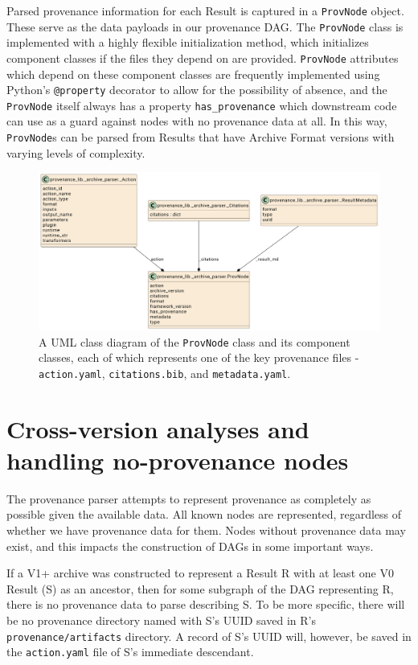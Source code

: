 Parsed provenance information for each Result is captured in a \texttt{ProvNode} object.
These serve as the data payloads in our provenance DAG. The \texttt{ProvNode} class is
implemented with a highly flexible initialization method, which initializes
component classes if the files they depend on are provided. \texttt{ProvNode} attributes
which depend on these component classes are frequently implemented using
Python’s \texttt{@property} decorator to allow for the possibility of absence, and the
\texttt{ProvNode} itself always has a property \texttt{has\_provenance} which downstream code can
use as a guard against nodes with no provenance data at all. In this way,
\texttt{ProvNode}s can be parsed from Results that have Archive Format versions with
varying levels of complexity. 

\begin{figure}[htp]
\centering
\includegraphics[width=\textwidth]{figures/ProvNode_UML.png}
\caption[UML Class diagram of the ProvNode class and its components]%
{A UML class diagram of the \texttt{ProvNode} class and its component classes, each of
which represents one of the key provenance files - \texttt{action.yaml}, \texttt{citations.bib},
and \texttt{metadata.yaml}.}
\label{fig:ProvNode_UML}
\end{figure}

\section{Cross-version analyses and handling no-provenance nodes}

The provenance parser attempts to represent provenance as completely as possible
given the available data. All known nodes are represented, regardless of whether
we have provenance data for them. Nodes without provenance data may exist, and
this impacts the construction of DAGs in some important ways.

If a V1+ archive was constructed to represent a Result R with at least one V0
Result (S) as an ancestor, then for some subgraph of the DAG representing R,
there is no provenance data to parse describing S. To be more specific, there
will be no provenance directory named with S’s UUID saved in R’s
\texttt{provenance/artifacts} directory. A record of S’s UUID will, however, be saved in
the \texttt{action.yaml} file of S’s immediate descendant.

